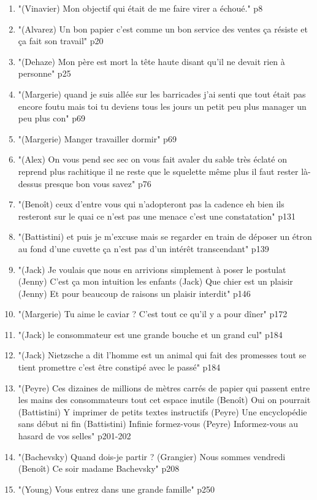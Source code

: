 \documentclass[a4paper,12pt]{book}
\newcommand{\Cit}[2]{\begin{tcolorbox}[sharp corners, colback=white,colframe=red!90!black!75, title=Citations : #1]#2\end{tcolorbox}}
\begin{document}
\Cit{Par-dessus bord}{
\begin{enumerate}
\item "(Vinavier) Mon objectif qui était de me faire virer a échoué." p8
\item "(Alvarez) Un bon papier c'est comme un bon service des ventes ça résiste et ça fait son travail" p20 
\item "(Dehaze) Mon père est mort la tête haute disant qu'il ne devait rien à personne" p25
\item "(Margerie) quand je suis allée sur les barricades j'ai senti que tout était pas encore foutu mais toi tu deviens tous les jours un petit peu plus manager un peu plus con" p69
\item "(Margerie) Manger travailler dormir" p69
\item "(Alex) On vous pend sec sec on vous fait avaler du sable très éclaté on reprend plus rachitique il ne reste que le squelette même plus il faut rester là-dessus presque bon vous savez" p76
\item "(Benoît) ceux d'entre vous qui n'adopteront pas la cadence eh bien ils resteront sur le quai ce n'est pas une menace c'est une constatation" p131
\item "(Battistini) et puis je m'excuse mais se regarder en train de déposer un étron au fond d'une cuvette ça n'est pas d'un intérêt transcendant" p139
\item "(Jack) Je voulais que nous en arrivions simplement à poser le postulat (Jenny) C'est ça mon intuition les enfants (Jack) Que chier est un plaisir (Jenny) Et pour beaucoup de raisons un plaisir interdit" p146
\item "(Margerie) Tu aime le caviar ? C'est tout ce qu'il y a pour dîner" p172
\item "(Jack) le consommateur est une grande bouche et un grand cul" p184
\item "(Jack) Nietzsche a dit l'homme est un animal qui fait des promesses tout se tient promettre c'est être constipé avec le passé" p184
\item "(Peyre) Ces dizaines de millions de mètres carrés de papier qui passent entre les mains des consommateurs tout cet espace inutile (Benoît) Oui on pourrait (Battistini) Y imprimer de petits textes instructifs (Peyre) Une encyclopédie sans début ni fin (Battistini) Infinie formez-vous (Peyre) Informez-vous au hasard de vos selles" p201-202
\item "(Bachevsky) Quand dois-je partir ? (Grangier) Nous sommes vendredi (Benoît) Ce soir madame Bachevsky" p208
\item "(Young) Vous entrez dans une grande famille" p250
\end{enumerate}
}
\end{document}
